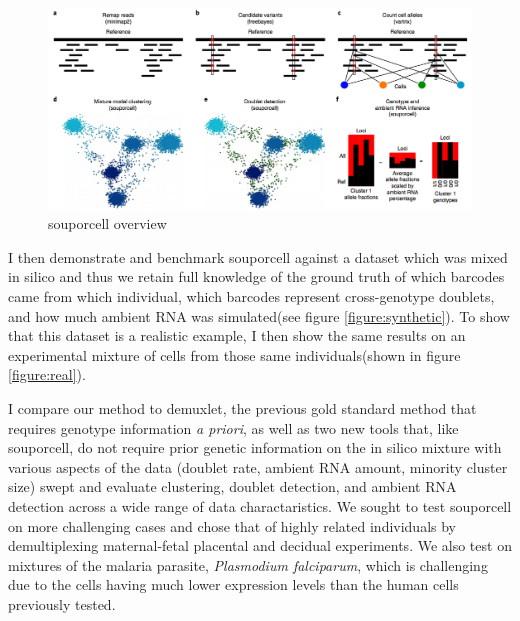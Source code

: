 \begin{figure}[th!]


\begin{centering}
\caption{souporcell overview}\label{fig:souporcell}

\includegraphics[width=\textwidth]{main.png} 
\end{centering}

\end{figure}
\par{
I then demonstrate and benchmark souporcell against a dataset which was mixed in silico and thus we retain full knowledge of the ground truth of which barcodes came from which individual, which barcodes represent cross-genotype doublets, and how much ambient RNA was simulated(see figure \ref{figure:synthetic}). To show that this dataset is a realistic example, I then show the same results on an experimental mixture of cells from those same individuals(shown in figure \ref{figure:real}).
} 
\par{
I compare our method to demuxlet, the previous gold standard method that requires genotype information \textit{a priori}, as well as two new tools that, like souporcell, do not require prior genetic information\cite{vireo}\cite{scsplit} on the in silico mixture with various aspects of the data (doublet rate, ambient RNA amount, minority cluster size) swept and evaluate clustering, doublet detection, and ambient RNA detection across a wide range of data charactaristics. We sought to test souporcell on more challenging cases and chose that of highly related individuals by demultiplexing maternal-fetal placental and decidual experiments. We also test on mixtures of the malaria parasite, \textit{Plasmodium falciparum}, which is challenging due to the cells having much lower expression levels than the human cells previously tested.
} 

